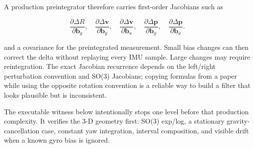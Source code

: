 A production preintegrator therefore carries first-order Jacobians such as

\[
\frac{\partial\Delta R}{\partial\mathbf b_g},\quad
\frac{\partial\Delta\mathbf v}{\partial\mathbf b_g},\quad
\frac{\partial\Delta\mathbf v}{\partial\mathbf b_a},\quad
\frac{\partial\Delta\mathbf p}{\partial\mathbf b_g},\quad
\frac{\partial\Delta\mathbf p}{\partial\mathbf b_a}.
\]

and a covariance for the preintegrated measurement. Small bias changes can then correct the delta without replaying every IMU sample. Large changes may require reintegration. The exact Jacobian recurrence depends on the left/right perturbation convention and SO(3) Jacobians; copying formulas from a paper while using the opposite rotation convention is a reliable way to build a filter that looks plausible but is inconsistent.

The executable witness below intentionally stops one level before that production complexity. It verifies the 3-D geometry first: SO(3) exp/log, a stationary gravity-cancellation case, constant yaw integration, interval composition, and visible drift when a known gyro bias is ignored.

